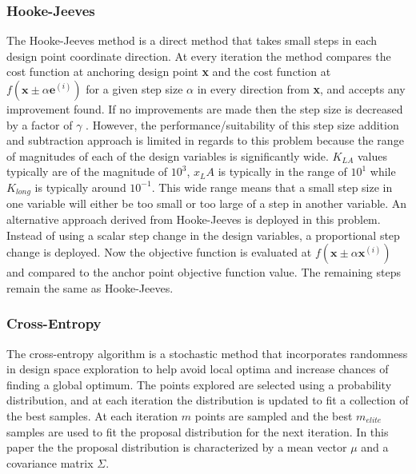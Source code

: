 \documentclass[conf]{new-aiaa}
\begin{document}
\subsubsection{Hooke-Jeeves}
The Hooke-Jeeves method is a direct method that takes small steps in each design point coordinate direction. At every iteration the method compares the cost function at anchoring design point \textbf{x} and the cost function at $f(\textbf{x}\pm\alpha \textbf{e}^{(i)})$ for a given step size $\alpha$ in every direction from \textbf{x}, and accepts any improvement found. If no improvements are made then the step size is decreased by a factor of $\gamma$ \cite{kochenderfer2019algorithms}.
However, the performance/suitability of this step size addition and subtraction approach is limited in regards to this problem because the range of magnitudes of each of the design variables is significantly wide. $K_{LA}$ values typically are of the magnitude of $10^3$, $x_LA$ is typically in the range of $10^1$ while $K_{long}$ is typically around $10^{-1}$. This wide range means that a small step size in one variable will  either be too small or too large of a step in another variable. An alternative approach derived from Hooke-Jeeves is deployed in this problem. Instead of using a scalar step change in the design variables, a proportional step change is deployed. Now the objective function is evaluated at $f(\textbf{x}\pm\alpha \textbf{x}^{(i)})$ and compared to the anchor point objective function value. The remaining steps remain the same as Hooke-Jeeves.

\subsubsection{Cross-Entropy}
The cross-entropy algorithm is a stochastic method that incorporates  randomness in design space exploration to help avoid local optima and increase chances of finding a global optimum\cite{rubinstein2004cross}. The points explored are selected using a probability distribution, and at each iteration the distribution is updated to fit a collection of the best samples\cite{kochenderfer2019algorithms}. At each iteration $m$ points are sampled and the best $m_{elite}$ samples are used to fit the proposal distribution for the next iteration. In this paper the the proposal distribution is characterized by a mean vector $\mu$ and a covariance matrix $\Sigma$.
\end{document}
